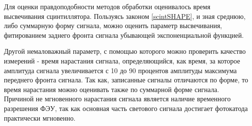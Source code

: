 Для оценки правдоподобности методов обработки оценивалось время высвечивания сцинтиллятора.
Пользуясь законом \eqref{scintSHAPE}, и зная среднюю, либо суммарную форму сигнала, можно оценить параметр высвечивания, фитированием заднего фронта сигнала убывающей экспоненциальной функцией.


Другой немаловажный параметр, с помощью которого можно проверить качество измерений - время нарастания сигнала, определяющийся, как время, за которое амплитуда сигнала увеличивается с 10 до 90 процентов амплитуды максимума переднего фронта сигнала. Так как, записанные сигналы отличаются по форме, то время нарастания можно оценивать также по суммарной форме сигнала. Причиной не мгновенного нарастания сигнала является наличие временного разрешения ФЭУ, так как основная часть светового сигнала достигает фотокатода практически мгновенно. 

